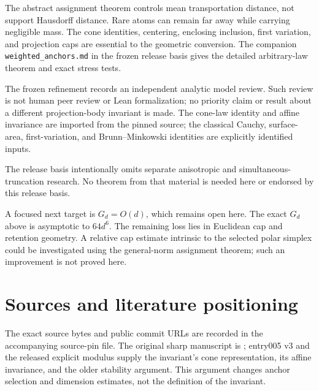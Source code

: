 \documentclass[11pt,letterpaper]{article}
\begin{document}
The abstract assignment theorem controls mean transportation distance,
not support Hausdorff distance. Rare atoms can remain far away while
carrying negligible mass. The cone identities, centering, enclosing
inclusion, first variation, and projection caps are essential to the
geometric conversion. The companion \nolinkurl{weighted_anchors.md} in
the frozen release basis gives the detailed arbitrary-law theorem and
exact stress tests.

The frozen refinement records an independent analytic model review. Such
review is not human peer review or Lean formalization; no priority claim
or result about a different projection-body invariant is made. The
cone-law identity and affine invariance are imported from the pinned
source; the classical Cauchy, surface-area, first-variation, and
Brunn--Minkowski identities are explicitly identified inputs.

The release basis intentionally omits separate anisotropic and
simultaneous-truncation research. No theorem from that material is needed
here or endorsed by this release basis.

A focused next target is $G_d=O(d)$, which remains open here. The exact
$G_d$ above is asymptotic to $64d^6$. The remaining loss lies in Euclidean
cap and retention geometry. A relative cap estimate intrinsic to the
selected polar simplex could be investigated using the general-norm
assignment theorem; such an improvement is not proved here.

\section{Sources and literature positioning}
The exact source bytes and public commit URLs are recorded in the
accompanying source-pin file. The original sharp manuscript is
\cite{sharp}; entry005 v3 \cite{entry} and the released explicit modulus
\cite{released} supply the invariant's cone representation, its affine
invariance, and the older stability argument. This argument changes anchor
selection and dimension estimates, not the definition of the invariant.
\end{document}
